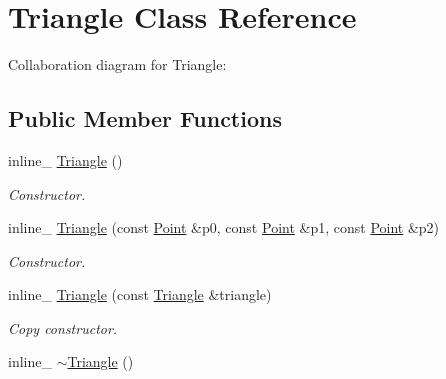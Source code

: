 \hypertarget{class_triangle}{\section{Triangle Class Reference}
\label{class_triangle}
}


Collaboration diagram for Triangle\+:
\subsection*{Public Member Functions}
\begin{DoxyCompactItemize}
\item 
\hypertarget{class_triangle_ac80e3c2a3d219c8aa81d99af89cae0f9}{inline\+\_\+ \hyperlink{class_triangle_ac80e3c2a3d219c8aa81d99af89cae0f9}{Triangle} ()}\label{class_triangle_ac80e3c2a3d219c8aa81d99af89cae0f9}

\begin{DoxyCompactList}\small\item\em Constructor. \end{DoxyCompactList}\item 
\hypertarget{class_triangle_a1acf1a7a9de668ddf66fc1661ad8cd14}{inline\+\_\+ \hyperlink{class_triangle_a1acf1a7a9de668ddf66fc1661ad8cd14}{Triangle} (const \hyperlink{class_point}{Point} \&p0, const \hyperlink{class_point}{Point} \&p1, const \hyperlink{class_point}{Point} \&p2)}\label{class_triangle_a1acf1a7a9de668ddf66fc1661ad8cd14}

\begin{DoxyCompactList}\small\item\em Constructor. \end{DoxyCompactList}\item 
\hypertarget{class_triangle_a6b07d7c9cfafa6a3422e4f55dd9e28dc}{inline\+\_\+ \hyperlink{class_triangle_a6b07d7c9cfafa6a3422e4f55dd9e28dc}{Triangle} (const \hyperlink{class_triangle}{Triangle} \&triangle)}\label{class_triangle_a6b07d7c9cfafa6a3422e4f55dd9e28dc}

\begin{DoxyCompactList}\small\item\em Copy constructor. \end{DoxyCompactList}\item 
\hypertarget{class_triangle_ab6a7b5183019a7282955c0c57f1ea98e}{inline\+\_\+ \hyperlink{class_triangle_ab6a7b5183019a7282955c0c57f1ea98e}{$\sim$\+Triangle} ()}\label{class_triangle_ab6a7b5183019a7282955c0c57f1ea98e}


\end{DoxyCompactItemize}
